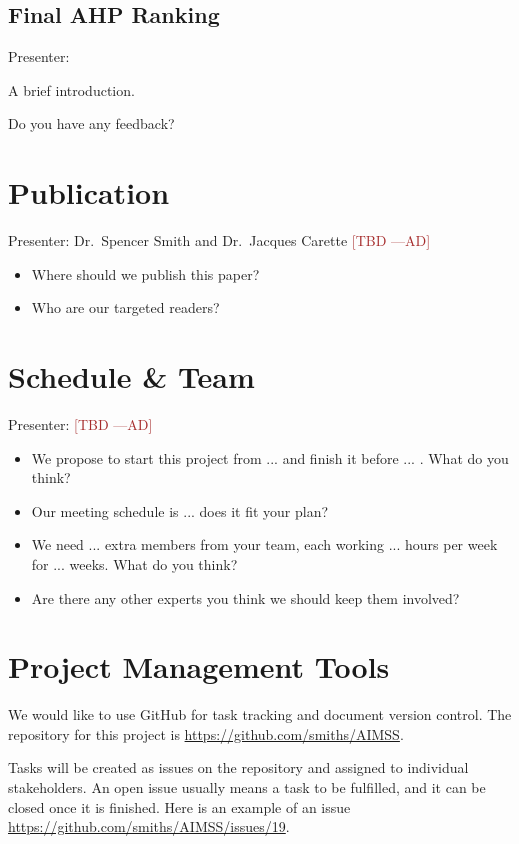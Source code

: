 \documentclass[12pt]{article}
\newcommand{\authornote}[3]{\textcolor{#1}{[#3 ---#2]}}
\newcommand{\authornote}[3]{}
\newcommand{\ad}[1]{\authornote{brown}{AD}{#1}} %
\begin{document}
\subsection{Final AHP Ranking}
\label{final_AHP}
Presenter:

A brief introduction. 

Do you have any feedback?

\section{Publication}
Presenter: Dr.\ Spencer Smith and Dr.\ Jacques Carette \ad{TBD}

\begin{itemize}
\item Where should we publish this paper?
\item Who are our targeted readers?
\end{itemize}

\section{Schedule \& Team}
Presenter: \ad{TBD}

\begin{itemize}
\item We propose to start this project from ... and finish it before ... . What
do you think?
\item Our meeting schedule is ... does it fit your plan?
\item We need ... extra members from your team, each working ... hours per week
for ... weeks. What do you think?
\item Are there any other experts you think we should keep them involved?
\end{itemize}

\appendix
\section{Project Management Tools}
\label{proj_mgmt_tools}
We would like to use GitHub for task tracking and document version control. The
repository for this project is
\href{https://github.com/smiths/AIMSS}{https://github.com/smiths/AIMSS}.

Tasks will be created as issues on the repository and assigned to individual
stakeholders. An open issue usually means a task to be fulfilled, and it can be
closed once it is finished. Here is an example of an issue
\href{https://github.com/smiths/AIMSS/issues/19}{https://github.com/smiths/AIMSS/issues/19}.
\end{document}
